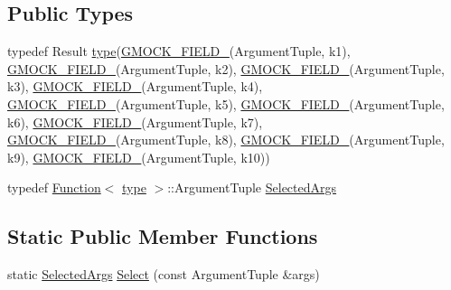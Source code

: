 \subsection*{Public Types}
\begin{DoxyCompactItemize}
\item 
typedef Result \hyperlink{classtesting_1_1internal_1_1SelectArgs_a9e8d3a748637b91376acab2330d87749}{type}(\hyperlink{gmock-generated-actions_8h_a6eb3ce92b0613603057a20ec9e593317}{G\+M\+O\+C\+K\+\_\+\+F\+I\+E\+L\+D\+\_\+}(Argument\+Tuple, k1), \hyperlink{gmock-generated-actions_8h_a6eb3ce92b0613603057a20ec9e593317}{G\+M\+O\+C\+K\+\_\+\+F\+I\+E\+L\+D\+\_\+}(Argument\+Tuple, k2), \hyperlink{gmock-generated-actions_8h_a6eb3ce92b0613603057a20ec9e593317}{G\+M\+O\+C\+K\+\_\+\+F\+I\+E\+L\+D\+\_\+}(Argument\+Tuple, k3), \hyperlink{gmock-generated-actions_8h_a6eb3ce92b0613603057a20ec9e593317}{G\+M\+O\+C\+K\+\_\+\+F\+I\+E\+L\+D\+\_\+}(Argument\+Tuple, k4), \hyperlink{gmock-generated-actions_8h_a6eb3ce92b0613603057a20ec9e593317}{G\+M\+O\+C\+K\+\_\+\+F\+I\+E\+L\+D\+\_\+}(Argument\+Tuple, k5), \hyperlink{gmock-generated-actions_8h_a6eb3ce92b0613603057a20ec9e593317}{G\+M\+O\+C\+K\+\_\+\+F\+I\+E\+L\+D\+\_\+}(Argument\+Tuple, k6), \hyperlink{gmock-generated-actions_8h_a6eb3ce92b0613603057a20ec9e593317}{G\+M\+O\+C\+K\+\_\+\+F\+I\+E\+L\+D\+\_\+}(Argument\+Tuple, k7), \hyperlink{gmock-generated-actions_8h_a6eb3ce92b0613603057a20ec9e593317}{G\+M\+O\+C\+K\+\_\+\+F\+I\+E\+L\+D\+\_\+}(Argument\+Tuple, k8), \hyperlink{gmock-generated-actions_8h_a6eb3ce92b0613603057a20ec9e593317}{G\+M\+O\+C\+K\+\_\+\+F\+I\+E\+L\+D\+\_\+}(Argument\+Tuple, k9), \hyperlink{gmock-generated-actions_8h_a6eb3ce92b0613603057a20ec9e593317}{G\+M\+O\+C\+K\+\_\+\+F\+I\+E\+L\+D\+\_\+}(Argument\+Tuple, k10))
\item 
typedef \hyperlink{structtesting_1_1internal_1_1Function}{Function}$<$ \hyperlink{classtesting_1_1internal_1_1SelectArgs_a9e8d3a748637b91376acab2330d87749}{type} $>$\+::Argument\+Tuple \hyperlink{classtesting_1_1internal_1_1SelectArgs_ad1eaa794653b3f4cefdb5c2285b418a7}{Selected\+Args}
\end{DoxyCompactItemize}
\subsection*{Static Public Member Functions}
\begin{DoxyCompactItemize}
\item 
static \hyperlink{classtesting_1_1internal_1_1SelectArgs_ad1eaa794653b3f4cefdb5c2285b418a7}{Selected\+Args} \hyperlink{classtesting_1_1internal_1_1SelectArgs_a372c597a96263b29d59fdb08183bc2e1}{Select} (const Argument\+Tuple \&args)
\end{DoxyCompactItemize}


